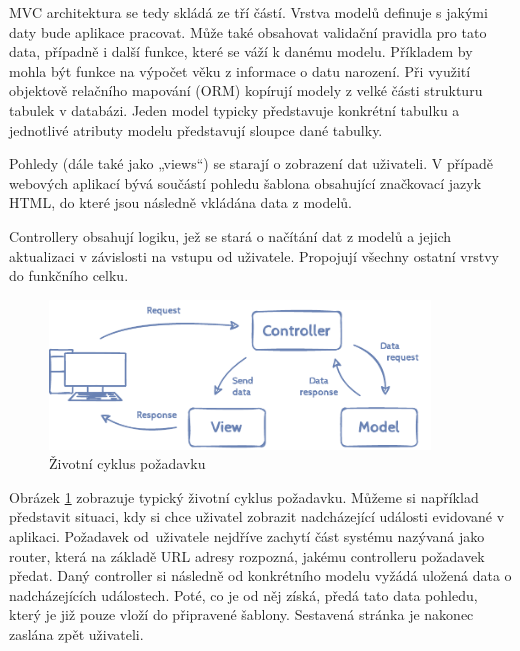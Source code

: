 MVC architektura se tedy skládá ze tří částí. Vrstva modelů definuje s jakými daty bude aplikace pracovat. Může také obsahovat validační pravidla pro tato data, případně i další funkce, které se váží k danému modelu. Příkladem by mohla být funkce na výpočet věku z informace o datu narození. Při využití objektově relačního mapování (ORM) kopírují modely z velké části strukturu tabulek v databázi. Jeden model typicky představuje konkrétní tabulku a jednotlivé atributy modelu představují sloupce dané tabulky.

Pohledy (dále také jako „views“) se starají o zobrazení dat uživateli. V případě webových aplikací bývá součástí pohledu šablona obsahující značkovací jazyk HTML, do které jsou následně vkládána data z modelů.

Controllery obsahují logiku, jež se stará o načítání dat z modelů a jejich aktualizaci v závislosti na vstupu od uživatele. Propojují všechny ostatní vrstvy do funkčního celku.

\begin{figure}[h]
	\caption{Životní cyklus požadavku}
	\label{figure:mvc}
	\centering
	\includegraphics[width=0.9\textwidth]{images/mvc.pdf}
\end{figure}

Obrázek \ref{figure:mvc} zobrazuje typický životní cyklus požadavku. Můžeme si například představit situaci, kdy si chce uživatel zobrazit nadcházející události evidované v aplikaci. Požadavek od~uživatele nejdříve zachytí část systému nazývaná jako router, která na základě URL adresy rozpozná, jakému controlleru požadavek předat. Daný controller si následně od konkrétního modelu vyžádá uložená data o nadcházejících událostech. Poté, co je od něj získá, předá tato data pohledu, který je již pouze vloží do připravené šablony. Sestavená stránka je nakonec zaslána zpět uživateli.
